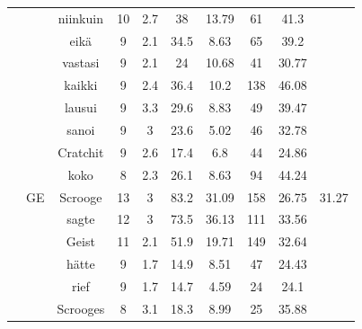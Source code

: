 \documentclass[shortpaper]{revdetua}
\begin{document}
\begin{table}[H]
\begin{tabular}{@{}cccccccccc@{}}
     & \multicolumn{1}{l|}{}   & niinkuin    & 10           & 2.7              & 38           & 13.79   & 61      & 41.3              &              \\
     & \multicolumn{1}{l|}{}   & eikä        & 9            & 2.1              & 34.5         & 8.63    & 65      & 39.2              &              \\
     & \multicolumn{1}{l|}{}   & vastasi     & 9            & 2.1              & 24           & 10.68   & 41      & 30.77             &              \\
     & \multicolumn{1}{l|}{}   & kaikki      & 9            & 2.4              & 36.4         & 10.2    & 138     & 46.08             &              \\
     & \multicolumn{1}{l|}{}   & lausui      & 9            & 3.3              & 29.6         & 8.83    & 49      & 39.47             &              \\
     & \multicolumn{1}{l|}{}   & sanoi       & 9            & 3                & 23.6         & 5.02    & 46      & 32.78             &              \\
     & \multicolumn{1}{l|}{}   & Cratchit    & 9            & 2.6              & 17.4         & 6.8     & 44      & 24.86             &              \\
     & \multicolumn{1}{l|}{}   & koko        & 8            & 2.3              & 26.1         & 8.63    & 94      & 44.24             &              \\ \cmidrule(l){2-10} 
     & \multicolumn{1}{l|}{GE} & Scrooge     & 13           & 3                & 83.2         & 31.09   & 158     & 26.75             & 31.27        \\
     & \multicolumn{1}{l|}{}   & sagte       & 12           & 3                & 73.5         & 36.13   & 111     & 33.56             &              \\
     & \multicolumn{1}{l|}{}   & Geist       & 11           & 2.1              & 51.9         & 19.71   & 149     & 32.64             &              \\
     & \multicolumn{1}{l|}{}   & hätte       & 9            & 1.7              & 14.9         & 8.51    & 47      & 24.43             &              \\
     & \multicolumn{1}{l|}{}   & rief        & 9            & 1.7              & 14.7         & 4.59    & 24      & 24.1              &              \\
     & \multicolumn{1}{l|}{}   & Scrooges    & 8            & 3.1              & 18.3         & 8.99    & 25      & 35.88             &              \\

\end{tabular}
\end{table}
\end{document}
